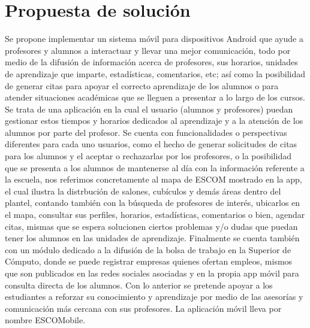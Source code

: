 \newline
\section{Propuesta de solución}

\noindent
Se propone implementar un sistema móvil para dispositivos Android que ayude a profesores y alumnos a interactuar y llevar una mejor 
comunicación, todo por medio de la difusión de información acerca de profesores, sus horarios, unidades de aprendizaje que imparte, estadísticas, comentarios, etc; así como la posibilidad de generar citas para apoyar el correcto aprendizaje de los 
alumnos o para atender situaciones académicas que se lleguen a presentar a lo largo de los cursos.
\newline
\newline
Se trata de una aplicación en la cual el usuario (alumnos y profesores) puedan gestionar estos tiempos y horarios dedicados al aprendizaje y a la atención de los alumnos por parte del profesor. Se cuenta con funcionalidades o perspectivas diferentes para cada uno usuarios, como
el hecho de generar solicitudes de citas para los alumnos y el aceptar o rechazarlas por los profesores, o la posibilidad que se presenta a los alumnos de mantenerse al día con la información referente a la escuela, nos referimos concretamente al mapa de ESCOM mostrado en la app, el cual ilustra la distrbución de salones, cubículos y demás áreas dentro del plantel, contando también con la búsqueda de profesores de interés, ubicarlos en el mapa, consultar sus perfiles, horarios, estadísticas, comentarios o bien, agendar citas, mismas que se espera solucionen ciertos problemas y/o dudas que puedan tener los alumnos en las unidades de aprendizaje. Finalmente se cuenta también con un módulo dedicado a la difusión de la bolsa de trabajo en la Superior de Cómputo, donde se puede registrar empresas quienes ofertan empleos, mismos que son publicados en las redes sociales asociadas y en la propia app móvil para consulta directa de los alumnos.
\newline
\newline
Con lo anterior se pretende apoyar a los estudiantes a reforzar su conocimiento y aprendizaje por medio de las asesorías y comunicación más cercana con sus profesores. La aplicación móvil lleva por nombre ESCOMobile.